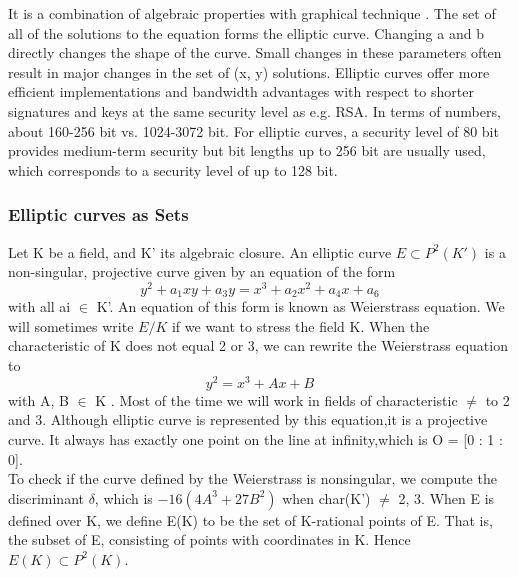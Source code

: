 \documentclass{report}
\begin{document}
  It is a combination of algebraic properties with graphical technique .
The set of all of the solutions to the equation forms the elliptic curve. Changing a and b directly changes the shape of the curve. Small changes in these parameters often result in major changes in the set of (x, y) solutions.
    Elliptic curves offer more efficient implementations and bandwidth advantages with respect to shorter signatures and keys at the same security level as e.g. RSA. In terms of numbers, about 160-256 bit vs. 1024-3072 bit. For elliptic curves, a security level of 80 bit provides medium-term security but bit lengths up to 256 bit are usually used, which corresponds to a security level of up to
128 bit.
\subsubsection{Elliptic curves as Sets}
Let K be a field, and K' its algebraic closure. An elliptic curve $E \subset P^2(K')$ is a non-singular, projective curve given by an equation of the form
$$y^2+a_1xy + a_3y = x^3 + a_2x^2 + a_4x + a_6$$
with all ai $\in$ K'. An equation of this form is known as Weierstrass equation. 
 We will sometimes write $E/K$ if we want to stress the field K.
When the characteristic of K does not equal 2 or 3, we can rewrite the Weierstrass equation to
$$y^2 = x^3 + Ax + B$$
with A, B $\in$ K . Most of the time we will work in fields of characteristic $\neq$ to 2 and 3.
Although elliptic curve is represented by this equation,it is a projective curve. It always has exactly one point on the line at infinity,which is O = [0 : 1 : 0].\\
To check if the curve defined by the Weierstrass is nonsingular, we compute the discriminant $\delta$, which is $−16(4A^3 + 27B^2)$ when char(K') $\neq$ 2, 3. When E is defined over K, we define E(K) to be the set of K-rational points of E. That is, the subset of E, consisting of points with coordinates in K. Hence $E(K) \subset P^2(K).$ \cite{stinson2005cryptography}
\end{document}
